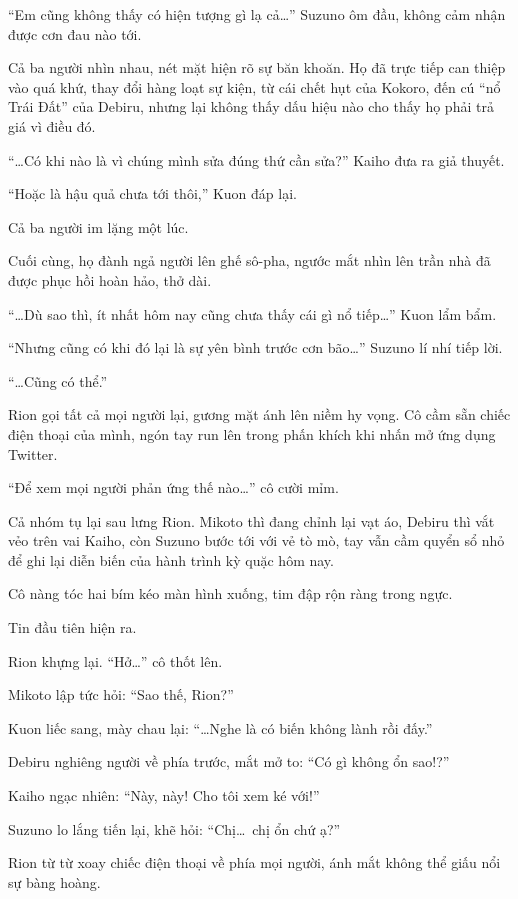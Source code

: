 \documentclass[../main.tex]{subfiles}
\begin{document}
``Em cũng không thấy có hiện tượng gì lạ cả\dots'' Suzuno ôm đầu, không cảm nhận được cơn đau nào tới.

Cả ba người nhìn nhau, nét mặt hiện rõ sự băn khoăn. Họ đã trực tiếp can thiệp vào quá khứ, thay đổi hàng loạt sự kiện, từ cái chết hụt của Kokoro, đến cú ``nổ Trái Đất'' của Debiru, nhưng lại không thấy dấu hiệu nào cho thấy họ phải trả giá vì điều đó.

``\dots Có khi nào là vì chúng mình sửa đúng thứ cần sửa?'' Kaiho đưa ra giả thuyết.

``Hoặc là hậu quả chưa tới thôi,'' Kuon đáp lại.

Cả ba người im lặng một lúc.

Cuối cùng, họ đành ngả người lên ghế sô-pha, ngước mắt nhìn lên trần nhà đã được phục hồi hoàn hảo, thở dài.

``\dots Dù sao thì, ít nhất hôm nay cũng chưa thấy cái gì nổ tiếp\dots'' Kuon lẩm bẩm.

``Nhưng cũng có khi đó lại là sự yên bình trước cơn bão\dots'' Suzuno lí nhí tiếp lời.

``\dots Cũng có thể.''

\ct

Rion gọi tất cả mọi người lại, gương mặt ánh lên niềm hy vọng. Cô cầm sẵn chiếc điện thoại của mình, ngón tay run lên trong phấn khích khi nhấn mở ứng dụng Twitter.

``Để xem mọi người phản ứng thế nào\dots'' cô cười mỉm.

Cả nhóm tụ lại sau lưng Rion. Mikoto thì đang chỉnh lại vạt áo, Debiru thì vắt vẻo trên vai Kaiho, còn Suzuno bước tới với vẻ tò mò, tay vẫn cầm quyển sổ nhỏ để ghi lại diễn biến của hành trình kỳ quặc hôm nay.

Cô nàng tóc hai bím kéo màn hình xuống, tim đập rộn ràng trong ngực.

Tin đầu tiên hiện ra.

Rion khựng lại. ``Hở\dots'' cô thốt lên.

Mikoto lập tức hỏi: ``Sao thế, Rion?''

Kuon liếc sang, mày chau lại: ``\dots Nghe là có biến không lành rồi đấy.''

Debiru nghiêng người về phía trước, mắt mở to: ``Có gì không ổn sao!?''

Kaiho ngạc nhiên: ``Này, này! Cho tôi xem ké với!''

Suzuno lo lắng tiến lại, khẽ hỏi: ``Chị\dots\ chị ổn chứ ạ?''

Rion từ từ xoay chiếc điện thoại về phía mọi người, ánh mắt không thể giấu nổi sự bàng hoàng.
\end{document}
